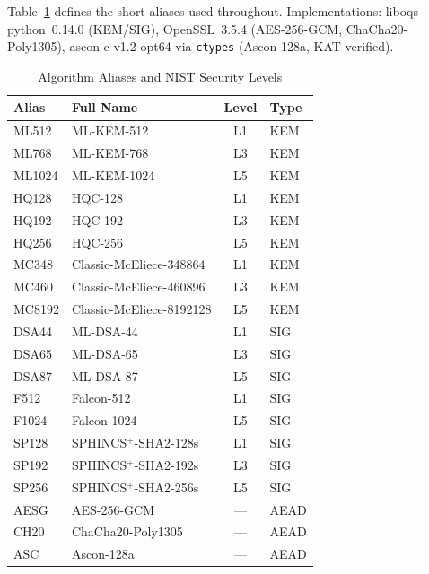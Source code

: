 Table~\ref{tab:aliases} defines the short aliases used throughout.
Implementations: liboqs-python~0.14.0 (KEM/SIG),
OpenSSL~3.5.4 (AES-256-GCM, ChaCha20-Poly1305),
ascon-c v1.2 opt64 via \texttt{ctypes} (Ascon-128a, KAT-verified).

\begin{table}[t]
\centering
\caption{Algorithm Aliases and NIST Security Levels}
\label{tab:aliases}
\footnotesize
\begin{tabular}{@{}llcl@{}}
\toprule
\textbf{Alias} & \textbf{Full Name} & \textbf{Level} & \textbf{Type} \\
\midrule
ML512  & ML-KEM-512                & L1 & KEM  \\
ML768  & ML-KEM-768                & L3 & KEM  \\
ML1024 & ML-KEM-1024               & L5 & KEM  \\
HQ128  & HQC-128                   & L1 & KEM  \\
HQ192  & HQC-192                   & L3 & KEM  \\
HQ256  & HQC-256                   & L5 & KEM  \\
MC348  & Classic-McEliece-348864   & L1 & KEM  \\
MC460  & Classic-McEliece-460896   & L3 & KEM  \\
MC8192 & Classic-McEliece-8192128  & L5 & KEM  \\
\midrule
DSA44  & ML-DSA-44                 & L1 & SIG  \\
DSA65  & ML-DSA-65                 & L3 & SIG  \\
DSA87  & ML-DSA-87                 & L5 & SIG  \\
F512   & Falcon-512                & L1 & SIG  \\
F1024  & Falcon-1024               & L5 & SIG  \\
SP128  & SPHINCS$^+$-SHA2-128s     & L1 & SIG  \\
SP192  & SPHINCS$^+$-SHA2-192s     & L3 & SIG  \\
SP256  & SPHINCS$^+$-SHA2-256s     & L5 & SIG  \\
\midrule
AESG   & AES-256-GCM               & ---& AEAD \\
CH20   & ChaCha20-Poly1305         & ---& AEAD \\
ASC    & Ascon-128a                & ---& AEAD \\
\bottomrule
\end{tabular}
\end{table}

